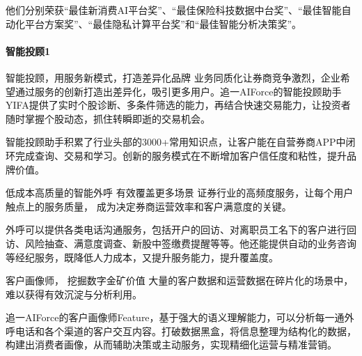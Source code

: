 \documentclass[letterpaper,11pt,english]{sphinxmanual}
\begin{document}
他们分别荣获“最佳新消费AI平台奖”、“最佳保险科技数据中台奖”、“最佳智能自动化平台方案奖”、“最佳隐私计算平台奖”和“最佳智能分析决策奖”。


\paragraph{智能投顾1\sphinxfootnotemark[238]}
\label{\detokenize{chapter_project/AI_Finance:id4}}%
\begin{footnotetext}[238]\sphinxAtStartFootnote
{}
%
\end{footnotetext}\ignorespaces 
智能投顾，用服务新模式，打造差异化品牌
业务同质化让券商竞争激烈，企业希望通过服务的创新打造出差异化，吸引更多用户。追一AIForce的智能投顾助手YIFA提供了实时个股诊断、多条件筛选的能力，再结合快速交易能力，让投资者随时掌握个股动态，抓住转瞬即逝的交易机会。

智能投顾助手积累了行业头部的3000+常用知识点，让客户能在自营券商APP中闭环完成查询、交易和学习。创新的服务模式在不断增加客户信任度和粘性，提升品牌价值。

低成本高质量的智能外呼 有效覆盖更多场景
证券行业的高频度服务，让每个用户触点上的服务质量，
成为决定券商运营效率和客户满意度的关键。

外呼可以提供各类电话沟通服务，包括开户的回访、对离职员工名下的客户进行回访、风险抽查、满意度调查、新股中签缴费提醒等等。他还能提供自动的业务咨询等经纪服务，既降低人力成本，又提升服务能力，提升覆盖度。

客户画像师， 挖掘数字金矿价值
大量的客户数据和运营数据在碎片化的场景中，难以获得有效沉淀与分析利用。

追一AIForce的客户画像师Feature，基于强大的语义理解能力，可以分析每一通外呼电话和各个渠道的客户交互内容。打破数据黑盒，将信息整理为结构化的数据，构建出消费者画像，从而辅助决策或主动服务，实现精细化运营与精准营销。
\end{document}
